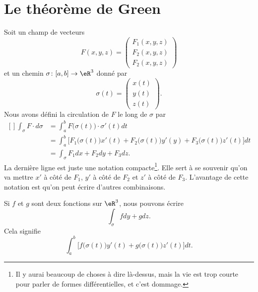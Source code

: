
\section{Le théorème de Green}

Soit un champ de vecteurs
\begin{equation}
    F(x,y,z)=\begin{pmatrix}
        F_1(x,y,z)    \\ 
        F_2(x,y,z)    \\ 
        F_2(x,y,z)    
    \end{pmatrix}
\end{equation}
et un chemin $\sigma\colon \mathopen[ a , b \mathclose]\to \eR^3$ donné par
\begin{equation}
    \sigma(t)=\begin{pmatrix}
        x(t)    \\ 
        y(t)    \\ 
        z(t)    
    \end{pmatrix}.
\end{equation}
Nous avons défini la circulation de $F$ le long de $\sigma$ par
\begin{equation}
    \begin{aligned}[]
        \int_{\sigma}F\cdot d\sigma&=\int_a^bF\big( \sigma(t) \big)\cdot\sigma'(t)dt\\
        &=\int_a^b\Big[ F_1\big( \sigma(t) \big)x'(t)+F_2\big( \sigma(t) \big)y'(y)+F_3\big( \sigma(t) \big)z'(t)\Big]dt\\
        &=\int_{\sigma} F_1dx +F_2dy+F_3dz.
    \end{aligned}
\end{equation}
La dernière ligne est juste une notation compacte\footnote{Il y aurai beaucoup de choses à dire là-dessus, mais la vie est trop courte pour parler de formes différentielles, et c'est dommage.}. Elle sert à se souvenir qu'on va mettre $x'$ à côté de $F_1$, $y'$ à côté de $F_2$ et $z'$ à côté de $F_3$. L'avantage de cette notation est qu'on peut écrire d'autres combinaisons.

Si $f$ et $g$ sont deux fonctions sur $\eR^3$, nous pouvons écrire
\begin{equation}
    \int_{\sigma} fdy+gdz.
\end{equation}
Cela signifie
\begin{equation}
    \int_a^b \Big[ f\big( \sigma(t) \big)y'(t)+g\big( \sigma(t) \big)z'(t)\Big]dt.
\end{equation}

